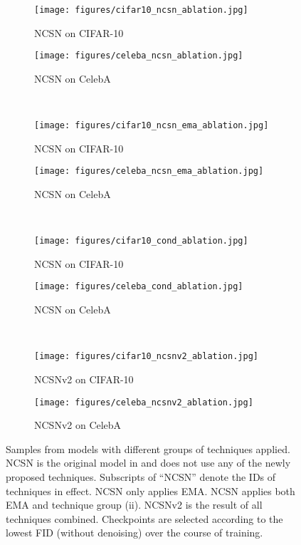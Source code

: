 \documentclass{article}
\begin{document}
\begin{figure}[H]
    \centering
    \begin{subfigure}{0.49\textwidth}
        \texttt{[image: figures/cifar10\_ncsn\_ablation.jpg]}
        \caption{NCSN on CIFAR-10}
    \end{subfigure}
    \begin{subfigure}{0.49\textwidth}
        \texttt{[image: figures/celeba\_ncsn\_ablation.jpg]}
        \caption{NCSN on CelebA}
    \end{subfigure}\\
    \begin{subfigure}{0.49\textwidth}
        \texttt{[image: figures/cifar10\_ncsn\_ema\_ablation.jpg]}
        \caption{NCSN on CIFAR-10}
    \end{subfigure}
    \begin{subfigure}{0.49\textwidth}
        \texttt{[image: figures/celeba\_ncsn\_ema\_ablation.jpg]}
        \caption{NCSN on CelebA}
    \end{subfigure}\\
    \begin{subfigure}{0.49\textwidth}
        \texttt{[image: figures/cifar10\_cond\_ablation.jpg]}
        \caption{NCSN on CIFAR-10}
    \end{subfigure}
    \begin{subfigure}{0.49\textwidth}
        \texttt{[image: figures/celeba\_cond\_ablation.jpg]}
        \caption{NCSN on CelebA}
    \end{subfigure}\\
    \begin{subfigure}{0.49\textwidth}
        \texttt{[image: figures/cifar10\_ncsnv2\_ablation.jpg]}
        \caption{NCSNv2 on CIFAR-10}
    \end{subfigure}
    \begin{subfigure}{0.49\textwidth}
        \texttt{[image: figures/celeba\_ncsnv2\_ablation.jpg]}
        \caption{NCSNv2 on CelebA}
    \end{subfigure}
    \caption{Samples from models with different groups of techniques applied. NCSN is the original model in \cite{song2019generative} and does not use any of the newly proposed techniques. Subscripts of ``NCSN'' denote the IDs of techniques in effect. NCSN only applies EMA. NCSN applies both EMA and technique group (ii). NCSNv2 is the result of all techniques combined. Checkpoints are selected according to the lowest FID (without denoising) over the course of training.}
    \label{fig:ablation_samples_no_denoising}
\end{figure}
\newpage
\end{document}
